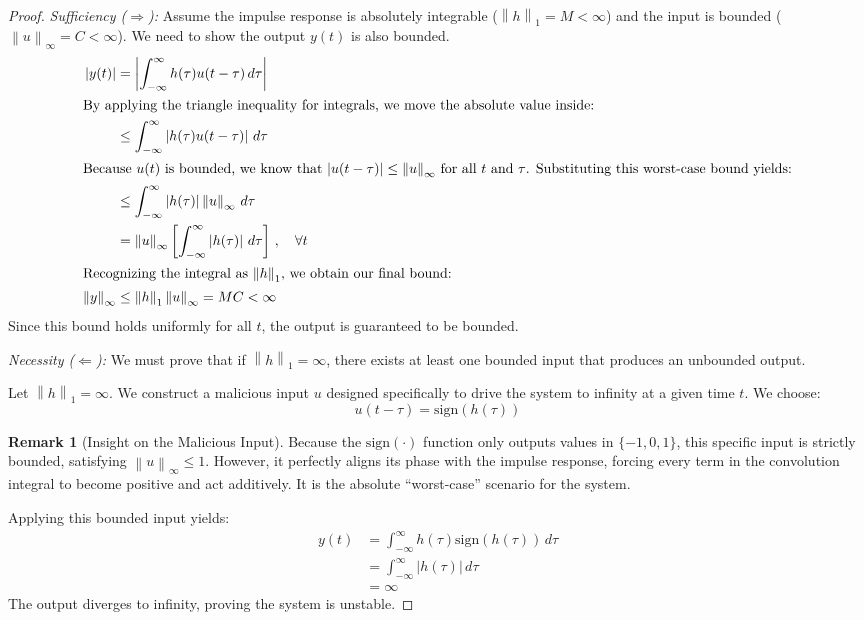 \documentclass[11pt, a4paper, twoside]{article}
\newcommand{\norm}[1]{\left\lVert#1\right\rVert}
\newcommand{\abs}[1]{\left\lvert#1\right\rvert}
\theoremstyle{plain}
\theoremstyle{definition}
\newtheorem{remark}[theorem]{Remark}
\begin{document}
\begin{proof}
\textit{Sufficiency ($\Rightarrow$):} Assume the impulse response is absolutely integrable ($\norm{h}_{1} = M < \infty$) and the input is bounded ($\norm{u}_{\infty} = C < \infty$). We need to show the output $y(t)$ is also bounded.
%
\begin{align*}
	\abs{y(t)} &= \abs{ \int_{-\infty}^{\infty} h(\tau) u(t - \tau) \, d\tau } \\
    \intertext{By applying the triangle inequality for integrals, we move the absolute value inside:}
	&\leq \int_{-\infty}^{\infty} \abs{h(\tau) u(t - \tau)} \, d\tau \\
    \intertext{Because $u(t)$ is bounded, we know that $\abs{u(t - \tau)} \leq \norm{u}_{\infty}$ for all $t$ and $\tau$. Substituting this worst-case bound yields:}
	&\leq \int_{-\infty}^{\infty} \abs{h(\tau)} \norm{u}_{\infty} \, d\tau \\
	&= \norm{u}_{\infty} \left[ \int_{-\infty}^{\infty} \abs{h(\tau)} \, d\tau \right]  \, , \quad \forall t
	\\
    \intertext{Recognizing the integral as $\norm{h}_1$, we obtain our final bound:}
	\norm{y}_{\infty} &\leq \norm{h}_1 \norm{u}_{\infty} = M C < \infty
\end{align*}
Since this bound holds uniformly for all $t$, the output is guaranteed to be bounded.

\textit{Necessity ($\Leftarrow$):} We must prove that if $\norm{h}_1 = \infty$, there exists at least one bounded input that produces an unbounded output. 

Let $\norm{h}_1 = \infty$. We construct a malicious input $u$ designed specifically to drive the system to infinity at a given time $t$. We choose:
$$u(t - \tau) = \mathrm{sign}( h(\tau) )$$

\begin{remark}[Insight on the Malicious Input]
Because the $\mathrm{sign}(\cdot)$ function only outputs values in $\{-1, 0, 1\}$, this specific input is strictly bounded, satisfying $\norm{u}_{\infty} \leq 1$. However, it perfectly aligns its phase with the impulse response, forcing every term in the convolution integral to become positive and act additively. It is the absolute ``worst-case'' scenario for the system.
\end{remark}

Applying this bounded input yields:
\begin{align*}
	y(t) &= \int_{-\infty}^{\infty} h(\tau) \mathrm{sign}( h(\tau) ) \, d\tau \\
	&= \int_{-\infty}^{\infty} \abs{h(\tau)} \, d\tau \\
    &= \infty
\end{align*}
The output diverges to infinity, proving the system is unstable.
\end{proof}
\end{document}
